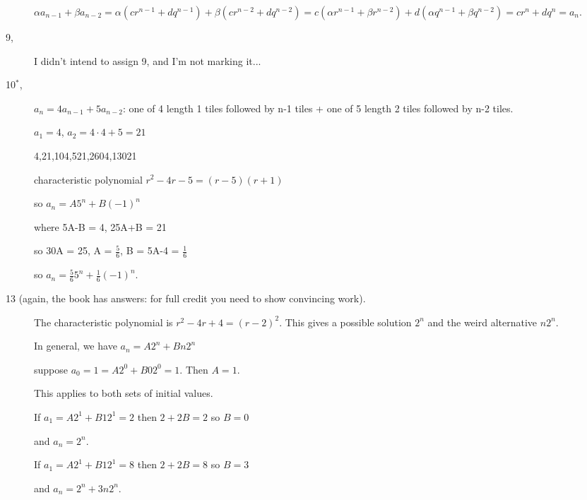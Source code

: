 \documentclass[12pt]{article}
\begin{document}
\begin{description}
$\alpha a_{n-1}+\beta a_{n-2} = \alpha( cr^{n-1} + d q^{n-1}) + \beta( cr^{n-2} + d q^{n-2}) = c(\alpha r^{n-1} + \beta r^{n-2}) + d(\alpha q^{n-1} + \beta q^{n-2}) = cr^n + dq^n = a_n$.

\item[ 9,]  I didn't intend to assign 9, and I'm not marking it...

\item[ 10$^*$, ]  $a_n = 4a_{n-1} + 5a_{n-2}$:  one of 4 length 1 tiles followed by n-1 tiles + one of 5 length 2 tiles followed by n-2 tiles.

$a_1 = 4$, $a_2 = 4\cdot 4 + 5 = 21$

4,21,104,521,2604,13021

characteristic polynomial $r^2-4r-5 = (r-5)(r+1)$

so $a_n = A5^n + B(-1)^n$ 

where  5A-B = 4, 25A+B = 21

so 30A = 25, A = $\frac 56$, B = 5A-4 = $\frac 16$

so $a_n = \frac 565^n + \frac16 (-1)^n$.



\item[13 (again, the book has answers: for full credit you need to show convincing work).]


The characteristic polynomial is $r^2-4r+4 = (r-2)^2$.  This gives a possible solution $2^n$ and the weird
alternative $n2^n$.

In general, we have $a_n = A2^n + Bn2^n$

suppose $a_0 = 1 =  A2^0 + B02^0 = 1$.  Then $A=1$.

This applies to both sets of initial values.

If $a_1 = A2^1 + B12^1 = 2$  then $2+2B = 2$ so $B = 0$

and $a_n = 2^n$.

If $a_1 = A2^1 + B12^1 = 8$  then $2+2B = 8$ so $B = 3$

and $a_n = 2^n+3n2^n$.


\end{description}
\end{document}
